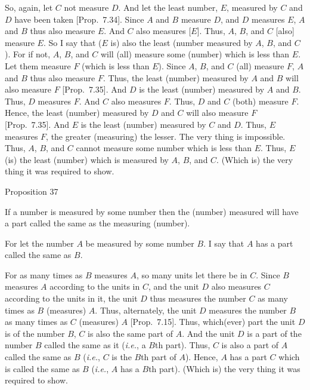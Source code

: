 So, again, let $C$ not measure $D$. And let the least number, $E$, measured
by $C$ and $D$ have been taken [Prop.~7.34].
Since $A$ and $B$ measure $D$, and $D$ measures $E$, $A$ and $B$ thus also
measure $E$. And $C$ also measures [$E$]. Thus, $A$, $B$, and $C$ [also] measure
$E$. So I say that ($E$ is) also the least (number measured by $A$, $B$, and $C$). For if not, $A$, $B$, and $C$ will (all) measure some (number) which
is less than $E$. Let them measure $F$ (which is less than $E$). Since
$A$, $B$, and $C$ (all) measure $F$, $A$ and $B$ thus also measure $F$. Thus,
the least (number) measured by $A$ and $B$ will also measure $F$  [Prop.~7.35]. And $D$ is the least (number) measured
by $A$ and $B$. Thus, $D$ measures $F$.  And $C$ also measures $F$. Thus, $D$ and $C$
(both) measure $F$. Hence, the least (number) measured by $D$ and $C$
will also measure $F$ [Prop.~7.35].
And $E$ is the least (number) measured by $C$ and $D$. Thus, $E$ measures $F$,
the greater (measuring) the lesser. The very thing is impossible.
Thus, $A$, $B$, and $C$ cannot measure some number which is less than $E$.
Thus, $E$ (is) the least (number) which is measured by $A$, $B$, and $C$.
(Which is) the very thing it was required to show.


\begin{center}
{\large Proposition 37}
\end{center}

If a number is measured by some number then
the (number) measured will have a part called the same as the
measuring (number).

\epsfysize=1.2in
\centerline{}

For let the number $A$ be measured by some number $B$. I say that $A$
has a part called the same as $B$.

For as many times as $B$ measures $A$, so many units let there be in $C$.
Since $B$ measures $A$ according to the units in $C$, and the unit $D$ also
measures $C$ according to the units in it,   the unit
$D$ thus measures the number $C$ as many times as $B$ (measures) $A$. Thus, alternately, the unit $D$ measures the number $B$ as many times as $C$  (measures) $A$  [Prop.~7.15].
Thus, which(ever) part the unit $D$ is of the number $B$, $C$ is also the same
part of $A$. And the unit $D$ is a part of the number $B$ called the same as it
({\em i.e.}, a $B$th part).
Thus, $C$ is also a part of $A$ called the same as $B$ ({\em i.e.}, $C$ is the $B$th part of $A$). Hence, $A$ has a part $C$
which is called the same  as $B$ ({\em i.e.}, $A$ has a $B$th part). (Which is) the very thing it was required to show.

